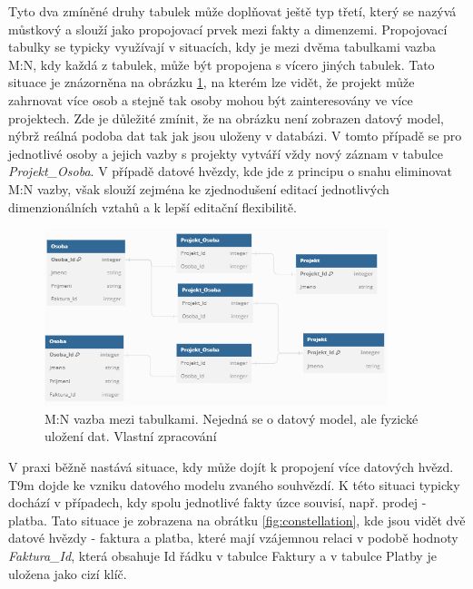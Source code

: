 \documentclass[
  digital,     %
  twoside,     %
  lof,         %
  lot,         %
]{fithesis4}
\begin{document}
Tyto dva zmíněné druhy tabulek může doplňovat ještě typ třetí, který se nazývá můstkový a slouží jako propojovací prvek mezi fakty a dimenzemi. Propojovací tabulky se typicky využívají v situacích, kdy je mezi dvěma tabulkami vazba M:N, kdy každá z tabulek, může být propojena s vícero jiných tabulek. Tato situace je znázorněna na  
obrázku \ref{fig:M_N}, na kterém lze vidět, že projekt může zahrnovat více osob a stejně tak osoby mohou být zainteresovány ve více projektech. Zde je důležité zmínit, že na obrázku není zobrazen datový model, nýbrž reálná podoba dat tak jak jsou uloženy v databázi. V tomto případě se pro jednotlivé osoby a jejich vazby s projekty vytváří vždy nový záznam v tabulce \emph{Projekt\_Osoba}. V případě datové hvězdy, kde jde z principu o snahu eliminovat M:N vazby, však slouží zejména ke zjednodušení editací jednotlivých dimenzionálních vztahů a k lepší editační flexibilitě. 
\begin{figure}[h]
  \begin{center}
          \includegraphics[width=10cm]{img/M_N.png}
  \end{center}
  \caption{M:N vazba mezi tabulkami. Nejedná se o datový model, ale fyzické uložení dat.  Vlastní zpracování}
  \label{fig:M_N}
\end{figure}  

V praxi běžně nastává situace, kdy může dojít k propojení více datových hvězd. T9m dojde ke vzniku datového modelu zvaného souhvězdí. K této situaci typicky dochází v případech, kdy spolu jednotlivé fakty úzce souvisí, např. prodej - platba. Tato situace je zobrazena na obrátku \ref{fig:constellation}, kde jsou vidět dvě datové hvězdy - faktura a platba, které mají vzájemnou relaci v podobě hodnoty \emph{Faktura\_Id}, která obsahuje Id řádku v tabulce Faktury a v tabulce Platby je uložena jako cizí klíč.
\end{document}
